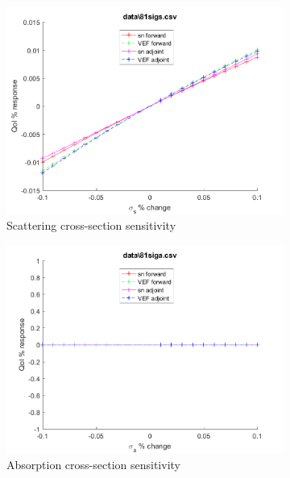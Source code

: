 \documentclass{article}
\begin{document}
\begin{figure}[H]
\begin{subfigure}{.5\textwidth}
  \includegraphics[width=.98\linewidth]{IanProposal/figures2/81sigsSens.png}
  \caption{Scattering cross-section sensitivity}
  \label{fig:sfig2}
\end{subfigure}%
\begin{subfigure}{.5\textwidth}
  \centering
  \includegraphics[width=.98\linewidth]{IanProposal/figures2/81sigaSens.png}
  \caption{Absorption cross-section sensitivity}
  \label{fig:sfig5}
\end{subfigure}%
\caption{}
\label{fig:fig}
\end{figure}
\newpage

\end{document}
